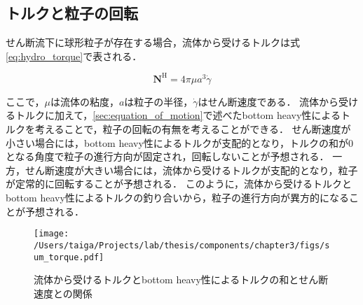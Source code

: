 \subsection{トルクと粒子の回転}
\label{sec:rotation}
せん断流下に球形粒子が存在する場合，流体から受けるトルクは式\eqref{eq:hydro_torque}で表される．

    \begin{equation}
        \boldsymbol{N}^\mathrm{H} = 4 \pi \mu a^3 \dot{\gamma}
        \label{eq:hydro_torque}
    \end{equation}

\noindent
ここで，$\mu$は流体の粘度，$a$は粒子の半径，$\dot{\gamma}$はせん断速度である．
流体から受けるトルクに加えて，\ref{sec:equation_of_motion}で述べたbottom heavy性によるトルクを考えることで，粒子の回転の有無を考えることができる．
せん断速度が小さい場合には，bottom heavy性によるトルクが支配的となり，トルクの和が0となる角度で粒子の進行方向が固定され，回転しないことが予想される．
一方，せん断速度が大きい場合には，流体から受けるトルクが支配的となり，粒子が定常的に回転することが予想される．
このように，流体から受けるトルクとbottom heavy性によるトルクの釣り合いから，粒子の進行方向が異方的になることが予想される．

\begin{figure}[htbp]
    \centering
    \texttt{[image: /Users/taiga/Projects/lab/thesis/components/chapter3/figs/sum\_torque.pdf]}
    \caption{流体から受けるトルクとbottom heavy性によるトルクの和とせん断速度との関係}
    \label{eq:sum_torque}
\end{figure}

